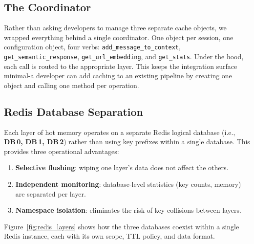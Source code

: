 \documentclass[conference]{IEEEtran}
\begin{document}
\subsection{The Coordinator}

Rather than asking developers to manage three separate cache objects, we wrapped everything behind a single coordinator. One object per session, one configuration object, four verbs: \texttt{add\_message\_to\_context}, \texttt{get\_semantic\_response}, \texttt{get\_url\_embedding}, and \texttt{get\_stats}. Under the hood, each call is routed to the appropriate layer. This keeps the integration surface minimal-a developer can add caching to an existing pipeline by creating one object and calling one method per operation.

\subsection{Redis Database Separation}

Each layer of hot memory operates on a separate Redis logical database (i.e., \textbf{DB\,0, DB\,1, DB\,2}) rather than using key prefixes within a single database. This provides three operational advantages:

\begin{enumerate}
\item \textbf{Selective flushing}: wiping one layer's data does not affect the others.
\item \textbf{Independent monitoring}: database-level statistics (key counts, memory) are separated per layer.
\item \textbf{Namespace isolation}: eliminates the risk of key collisions between layers.
\end{enumerate}

Figure~\ref{fig:redis_layers} shows how the three databases coexist within a single Redis instance, each with its own scope, TTL policy, and data format.
\end{document}
